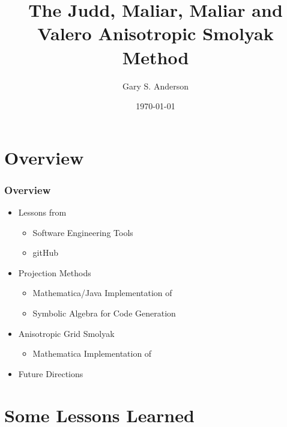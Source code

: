\documentclass[tikz]{beamer}
\begin{document}
\title[The Anisotropic Smolyak Method]{The Judd, Maliar, Maliar and Valero Anisotropic Smolyak Method}


\author{Gary S. Anderson}
\date{\today} 


\frame{\titlepage}


\section{Overview}



\begin{frame}
  \frametitle{Overview}
  
  \begin{itemize}
  \item Lessons from \cite{anderson10b}
    \begin{itemize}
    \item Software Engineering Tools
    \item gitHub 
    \end{itemize}

  \item Projection Methods
    \begin{itemize}
    \item Mathematica/Java Implementation of \cite{judd92}
  \item Symbolic Algebra for Code Generation
    \end{itemize}
  \item Anisotropic Grid Smolyak
    \begin{itemize}
    \item Mathematica Implementation of \cite{Judd2014}
    \end{itemize}
  \item Future Directions
  \end{itemize}
\end{frame}



\section{Some Lessons Learned}


\end{document}
